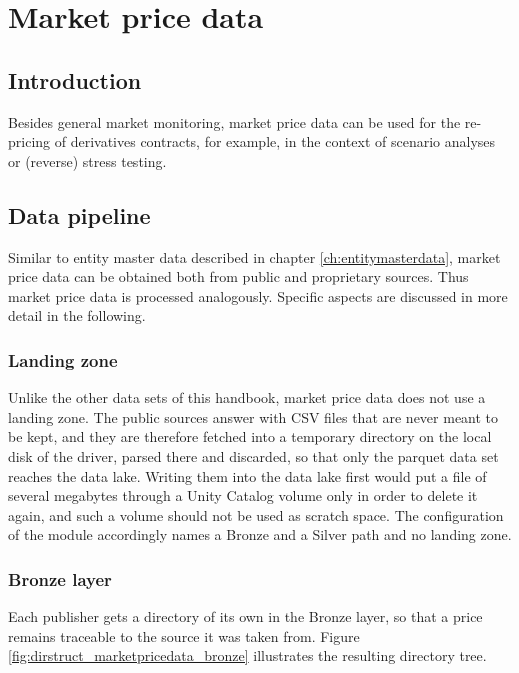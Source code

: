 

\chapter{Market price data}\label{ch:marketpricedata}

\section{Introduction}

Besides general market monitoring, market price data can be used for the re-pricing of derivatives contracts, for example, in the context of scenario analyses or (reverse) stress testing.

\section{Data pipeline}

Similar to entity master data described in chapter \ref{ch:entitymasterdata}, market price data can be obtained both from public and proprietary sources. Thus market price data is processed analogously. Specific aspects are discussed in more detail in the following.

\subsection{Landing zone}

Unlike the other data sets of this handbook, market price data does not use a landing zone. The public sources answer with CSV files that are never meant to be kept, and they are therefore fetched into a temporary directory on the local disk of the driver, parsed there and discarded, so that only the parquet data set reaches the data lake. Writing them into the data lake first would put a file of several megabytes through a Unity Catalog volume only in order to delete it again, and such a volume should not be used as scratch space. The configuration of the module accordingly names a Bronze and a Silver path and no landing zone.

\subsection{Bronze layer}

Each publisher gets a directory of its own in the Bronze layer, so that a price remains traceable to the source it was taken from. Figure \ref{fig:dirstruct_marketpricedata_bronze} illustrates the resulting directory tree.

